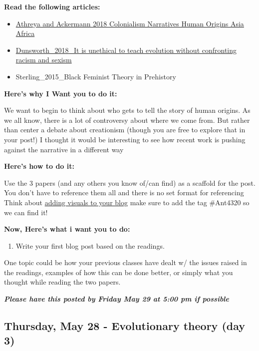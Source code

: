 \documentclass[]{tufte-handout}
\providecommand{\tightlist}{%
  \setlength{\itemsep}{0pt}\setlength{\parskip}{0pt}}
\begin{document}
\textbf{Read the following articles:}

\begin{itemize}
\item
  \href{https://osf.io/f43tr/}{Athreya and Ackermann 2018 Colonialism
  Narratives Human Origins Asia Africa}
\item
  \href{https://evolution-institute.org/it-is-unethical-to-teach-evolution-without-confronting-racism-and-sexism/}{Dunsworth\_2018\_It
  is unethical to teach evolution without confronting racism and sexism}
\item
  Sterling\_2015\_Black Feminist Theory in Prehistory
\end{itemize}

\begin{marginfigure}
\textbf{Here's why I Want you to do it:}

We want to begin to think about who gets to tell the story of human
origins. As we all know, there is a lot of controversy about where we
come from. But rather than center a debate about creationism (though you
are free to explore that in your post!) I thought it would be
interesting to see how recent work is pushing against the narrative in a
different way

\textbf{Here's how to do it:}

Use the 3 papers (and any others you know of/can find) as a scaffold for
the post. You don't have to reference them all and there is no set
format for referencing Think about
\href{https://oudigitools.blogspot.com/2020/05/images-in-posts.html}{adding
visuals to your blog} make sure to add the tag \#Ant4320 so we can find
it!
\end{marginfigure}

\textbf{Now, Here's what i want you to do:}

\begin{enumerate}
\def\labelenumi{\arabic{enumi}.}
\tightlist
\item
  Write your first blog post based on the readings.
\end{enumerate}

One topic could be how your previous classes have dealt w/ the issues
raised in the readings, examples of how this can be done better, or
simply what you thought while reading the two papers.

\textbf{\emph{Please have this posted by Friday May 29 at 5:00 pm if
possible}}

\hypertarget{thursday-may-28---evolutionary-theory-day-3}{%
\subsection{Thursday, May 28 - Evolutionary theory (day
3)}\label{thursday-may-28---evolutionary-theory-day-3}}
\end{document}
